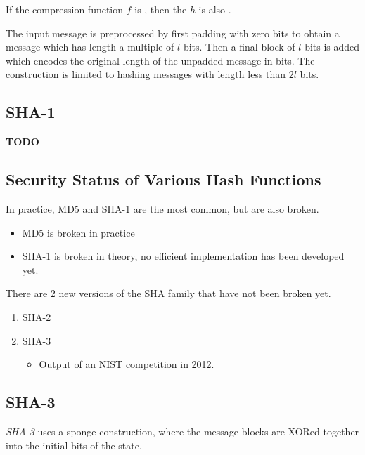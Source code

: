 \begin{theorem}
  If the compression function $f$ is , then the  $h$ is also .
\end{theorem}

\begin{definition}\label{def:Length_Strengthening}
  The input message is preprocessed by first padding with zero bits to obtain a message which has length a multiple of $l$ bits.
  Then a final block of $l$ bits is added which encodes the original length of the unpadded message in bits.
  The construction is limited to hashing messages with length less than $2l$ bits.
\end{definition}

\subsection{SHA-1}\label{subsec:SHA_1}
\textbf{TODO}

\subsection{Security Status of Various Hash Functions}\label{subsec:Hash_Functions_Security_Status}
In practice, MD5 and SHA-1 are the most common, but are also broken.
\begin{itemize}[noitemsep]
\item MD5 is broken in practice
\item SHA-1 is broken in theory, no efficient implementation has been developed yet.
\end{itemize}

There are 2 new versions of the SHA family that have not been broken yet.
\begin{enumerate}[noitemsep]
\item SHA-2
\item SHA-3
  \begin{itemize}[noitemsep]
  \item Output of an NIST competition in 2012.
  \end{itemize}
\end{enumerate}

\subsection{SHA-3}\label{subsec:SHA_3}
\begin{definition}[SHA-3]\label{def:SHA_3}
  \emph{SHA-3} uses a sponge construction, where the message blocks are XORed together into the initial bits of the state.
\end{definition}

